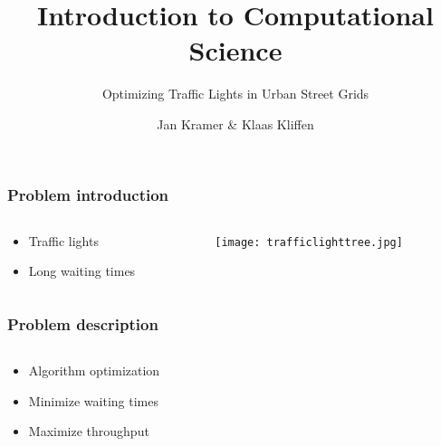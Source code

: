 \documentclass[11pt]{beamer}
\title{Introduction to Computational Science}
\subtitle{Optimizing Traffic Lights in Urban Street Grids}
\author{Jan Kramer \& Klaas Kliffen}
\begin{document}
\maketitle

\begin{frame}
\frametitle{Problem introduction}
\begin{columns}
    \begin{column}{.5\textwidth}
        \begin{itemize}
            \item Traffic lights
            \item Long waiting times
        \end{itemize}
    \end{column}
    \begin{column}{.5\textwidth}
        \begin{figure}
        \centering
        \texttt{[image: trafficlighttree.jpg]}
        \end{figure}
    \end{column}
\end{columns}
\end{frame}


\begin{frame}
\frametitle{Problem description}
\begin{columns}
    \begin{column}{.5\textwidth}
        \begin{itemize}
            \item Algorithm optimization
            \item Minimize waiting times
            \item Maximize throughput
        \end{itemize}
    \end{column}
    \begin{column}{.5\textwidth}
    \end{column}
\end{columns}
\end{frame}
\end{document}
